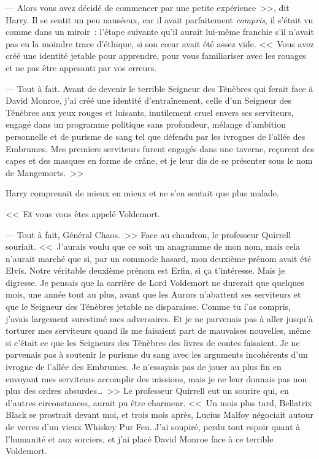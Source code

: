 --- Alors vous avez décidé de commencer par une petite expérience~>>, dit Harry. Il se sentit un peu nauséeux, car il avait parfaitement \emph{compris}, il s'était vu comme dans un miroir~: l'étape suivante qu'il aurait lui-même franchie s'il n'avait pas eu la moindre trace d'éthique, si son cœur avait été assez vide. <<~Vous avez créé une identité jetable pour apprendre, pour vous familiariser avec les rouages et ne pas être appesanti par vos erreurs.

--- Tout à fait. Avant de devenir le terrible Seigneur des Ténèbres qui ferait face à David Monroe, j'ai créé une identité d'entraînement, celle d'un Seigneur des Ténèbres aux yeux rouges et luisants, inutilement cruel envers ses serviteurs, engagé dans un programme politique sans profondeur, mélange d'ambition personnelle et de purisme de sang tel que défendu par les ivrognes de l'allée des Embrumes. Mes premiers serviteurs furent engagés dans une taverne, reçurent des capes et des masques en forme de crâne, et je leur dis de se présenter sous le nom de Mangemorts.~>>

Harry comprenait de mieux en mieux et ne s'en sentait que plus malade.

<<~Et vous vous êtes appelé Voldemort.

--- Tout à fait, Général Chaos.~>> Face au chaudron, le professeur Quirrell souriait. <<~J'aurais voulu que ce soit un anagramme de mon nom, mais cela n'aurait marché que si, par un commode hasard, mon deuxième prénom avait été Elvis. Notre véritable deuxième prénom est Erfin, si ça t'intéresse. Mais je digresse. Je pensais que la carrière de Lord Voldemort ne durerait que quelques mois, une année tout au plus, avant que les Aurors n'abattent ses serviteurs et que le Seigneur des Ténèbres jetable ne disparaisse. Comme tu l'as compris, j'avais largement surestimé mes adversaires. Et je ne parvenais pas à aller jusqu'à torturer mes serviteurs quand ils me faisaient part de mauvaises nouvelles, même si c'était ce que les Seigneurs des Ténèbres des livres de contes faisaient. Je ne parvenais pas à soutenir le purisme du sang avec les arguments incohérents d'un ivrogne de l'allée des Embrumes. Je n'essayais pas de jouer au plus fin en envoyant mes serviteurs accomplir des missions, mais je ne leur donnais pas non plus des ordres absurdes…~>> Le professeur Quirrell eut un sourire qui, en d'autres circonstances, aurait pu être charmeur. <<~Un mois plus tard, Bellatrix Black se prostrait devant moi, et trois mois après, Lucius Malfoy négociait autour de verres d'un vieux Whiskey Pur Feu. J'ai soupiré, perdu tout espoir quant à l'humanité et aux sorciers, et j'ai placé David Monroe face à ce terrible Voldemort.

